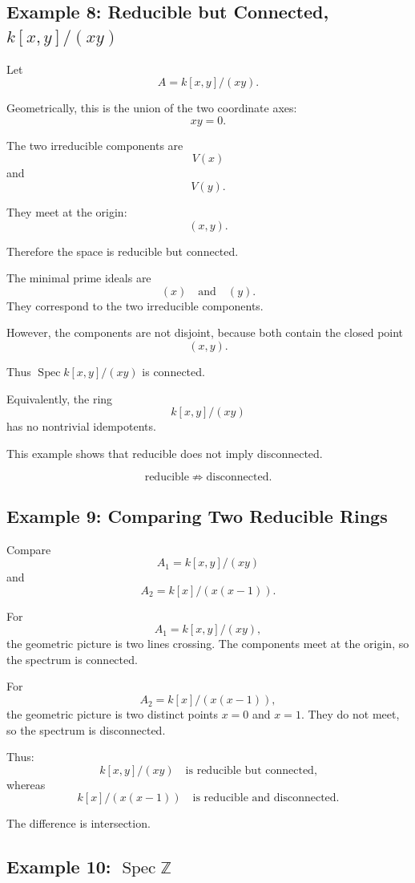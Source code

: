\documentclass[12pt,a4paper]{article}
\newcommand{\Z}{\mathbb{Z}}
\newcommand{\Spec}{\operatorname{Spec}}
\begin{document}
\subsection{Example 8: Reducible but Connected, \(k[x,y]/(xy)\)}

Let
\[
A=k[x,y]/(xy).
\]

Geometrically, this is the union of the two coordinate axes:
\[
xy=0.
\]

The two irreducible components are
\[
V(x)
\]
and
\[
V(y).
\]

They meet at the origin:
\[
(x,y).
\]

Therefore the space is reducible but connected.

The minimal prime ideals are
\[
(x)
\quad\text{and}\quad
(y).
\]
They correspond to the two irreducible components.

However, the components are not disjoint, because both contain the closed point
\[
(x,y).
\]

Thus \(\Spec k[x,y]/(xy)\) is connected.

Equivalently, the ring
\[
k[x,y]/(xy)
\]
has no nontrivial idempotents.

This example shows that reducible does not imply disconnected.

\[
\boxed{
	\text{reducible}
	\not\Rightarrow
	\text{disconnected}.
}
\]

\subsection{Example 9: Comparing Two Reducible Rings}

Compare
\[
A_1=k[x,y]/(xy)
\]
and
\[
A_2=k[x]/(x(x-1)).
\]

For
\[
A_1=k[x,y]/(xy),
\]
the geometric picture is two lines crossing. The components meet at the origin,
so the spectrum is connected.

For
\[
A_2=k[x]/(x(x-1)),
\]
the geometric picture is two distinct points \(x=0\) and \(x=1\). They do not
meet, so the spectrum is disconnected.

Thus:
\[
k[x,y]/(xy)
\quad\text{is reducible but connected,}
\]
whereas
\[
k[x]/(x(x-1))
\quad\text{is reducible and disconnected.}
\]

The difference is intersection.

\subsection{Example 10: \(\Spec \Z\)}
\end{document}
